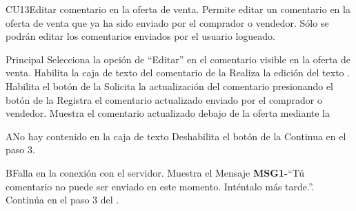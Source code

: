 \begin{UseCase}{CU13}{Editar comentario en la oferta de venta.}{
		Permite editar un comentario en la oferta de venta que ya ha sido enviado por el comprador o vendedor. Sólo se podrán editar los comentarios enviados por el usuario logueado.
	}
		
	\end{UseCase}

	\begin{UCtrayectoria}{Principal}
		\UCpaso[\UCactor] Selecciona la opción de ``Editar'' en el comentario visible en la oferta de venta.
		\UCpaso Habilita la caja de texto del comentario  de la 
		\UCpaso[\UCactor] Realiza la edición del texto .
		\UCpaso Habilita el botón  de la 
		\UCpaso[\UCactor] Solicita la actualización del comentario presionando el botón  de la 
		\UCpaso Registra el comentario actualizado enviado por el comprador o vendedor.
		\UCpaso Muestra el comentario actualizado debajo de la oferta mediante la 
\end{UCtrayectoria}
		\begin{UCtrayectoriaA}{A}{No hay contenido en la caja de texto}
			\UCpaso Deshabilita el botón  de la 
			\UCpaso Continua en el paso 3.
		\end{UCtrayectoriaA}
		
		\begin{UCtrayectoriaA}{B}{Falla en la conexión con el servidor.}
			\UCpaso Muestra el Mensaje {\bf MSG1-}``Tú comentario no puede ser enviado en este momento. Inténtalo más tarde.''.
			\UCpaso Continúa en el paso 3 del .
		\end{UCtrayectoriaA}
		
		
		
